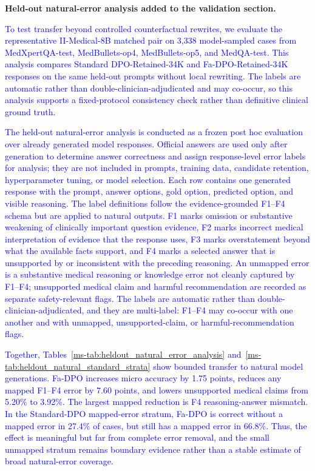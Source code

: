 \documentclass[12pt]{article}
\newcommand{\added}[1]{\textcolor{blue}{#1}}
\begin{document}
\textbf{Held-out natural-error analysis added to the validation section.}
\begin{displayquote}
\added{To test transfer beyond controlled counterfactual rewrites, we evaluate the representative II-Medical-8B matched pair on 3,338 model-sampled cases from MedXpertQA-test, MedBullets-op4, MedBullets-op5, and MedQA-test. This analysis compares Standard DPO-Retained-34K and Fa-DPO-Retained-34K responses on the same held-out prompts without local rewriting. The labels are automatic rather than double-clinician-adjudicated and may co-occur, so this analysis supports a fixed-protocol consistency check rather than definitive clinical ground truth.}

\added{The held-out natural-error analysis is conducted as a frozen post hoc evaluation over already generated model responses. Official answers are used only after generation to determine answer correctness and assign response-level error labels for analysis; they are not included in prompts, training data, candidate retention, hyperparameter tuning, or model selection. Each row contains one generated response with the prompt, answer options, gold option, predicted option, and visible reasoning. The label definitions follow the evidence-grounded F1--F4 schema but are applied to natural outputs. F1 marks omission or substantive weakening of clinically important question evidence, F2 marks incorrect medical interpretation of evidence that the response uses, F3 marks overstatement beyond what the available facts support, and F4 marks a selected answer that is unsupported by or inconsistent with the preceding reasoning. An unmapped error is a substantive medical reasoning or knowledge error not cleanly captured by F1--F4; unsupported medical claim and harmful recommendation are recorded as separate safety-relevant flags. The labels are automatic rather than double-clinician-adjudicated, and they are multi-label: F1--F4 may co-occur with one another and with unmapped, unsupported-claim, or harmful-recommendation flags.}

\added{Together, Tables~\ref*{ms-tab:heldout_natural_error_analysis} and~\ref*{ms-tab:heldout_natural_standard_strata} show bounded transfer to natural model generations. Fa-DPO increases micro accuracy by 1.75 points, reduces any mapped F1--F4 error by 7.60 points, and lowers unsupported medical claims from 5.20\% to 3.92\%. The largest mapped reduction is F4 reasoning-answer mismatch. In the Standard-DPO mapped-error stratum, Fa-DPO is correct without a mapped error in 27.4\% of cases, but still has a mapped error in 66.8\%. Thus, the effect is meaningful but far from complete error removal, and the small unmapped stratum remains boundary evidence rather than a stable estimate of broad natural-error coverage.}
\end{displayquote}
\end{document}
